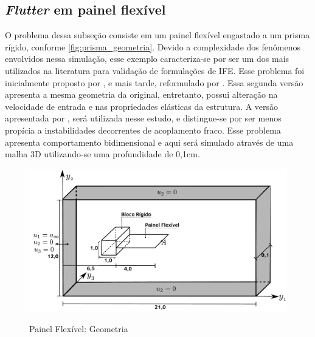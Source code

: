\begin{figure}[!htbp]
	\label{fig:casca_campo_desloc}
\end{figure}

\subsection{\textit{Flutter} em painel flexível}

O problema dessa subseção consiste em um painel flexível engastado a um prisma rígido, conforme \autoref{fig:prisma_geometria}. Devido a complexidade dos fenômenos envolvidos nessa simulação, esse exemplo caracteriza-se por ser um dos mais utilizados na literatura para validação de formulações de IFE. Esse problema foi inicialmente proposto por , e mais tarde, reformulado por . Essa segunda versão apresenta a mesma geometria da original, entretanto, possui alteração na velocidade de entrada e nas propriedades elásticas da estrutura. A versão apresentada por , será utilizada nesse estudo, e distingue-se por ser menos propícia a instabilidades decorrentes de acoplamento fraco. Esse problema apresenta comportamento bidimensional e aqui será simulado através de uma malha 3D utilizando-se uma profundidade de 0,1cm.

\begin{figure}[!htbp]
	\caption{Painel Flexível: Geometria}
	\centering 
	\includegraphics[scale=0.5,trim=0cm 0cm 0cm 0cm, clip=true]{Imagens/Cap7/prisma_geometria.pdf}	
	\label{fig:prisma_geometria}
\end{figure}

